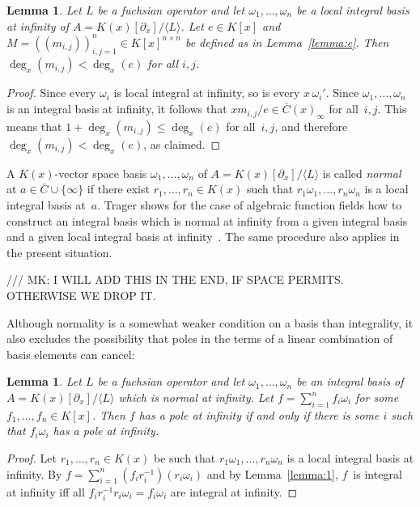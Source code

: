 \documentclass{sig-alternate}
\newtheorem{lemma}[theorem]{Lemma}
\def\<#1>{\langle#1\rangle}
\begin{document}
\begin{lemma} \label{lemma:degM}
  Let $L$ be a fuchsian operator and let $\omega_1,\dots,\omega_n$ be a local integral
  basis at infinity of $A=K(x)[\partial_x]/\<L>$. Let $e\in K[x]$ and $M=((m_{i,j}))_{i,j=1}^n\in K[x]^{n\times n}$
  be defined as in Lemma~\ref{lemma:e}. Then $\deg_x(m_{i,j})<\deg_x(e)$ for all $i,j$.
\end{lemma}
\begin{proof}
  Since every $\omega_i$ is local integral at infinity, so is every $x\,\omega_i'$.
  Since $\omega_1,\dots,\omega_n$ is an integral basis at infinity, it follows that
  $xm_{i,j}/e\in\bar C(x)_\infty$ for all~$i,j$. This means that $1+\deg_x(m_{i,j})\leq\deg_x(e)$
  for all~$i,j$, and therefore $\deg_x(m_{i,j})<\deg_x(e)$, as claimed.
\end{proof}

A $K(x)$-vector space basis $\omega_1,\dots,\omega_n$ of $A=K(x)[\partial_x]/\<L>$ is
called \emph{normal} at $a\in\bar C\cup\{\infty\}$ if there exist $r_1,\dots,r_n\in
K(x)$ such that $r_1\omega_1,\dots,r_n\omega_n$ is a local integral basis
at~$a$. Trager shows for the case of algebraic function fields how to construct
an integral basis which is normal at infinity from a given integral basis and
a given local integral basis at infinity~\cite{trager84}. The same procedure also applies
in the present situation. %

/// MK: I WILL ADD THIS IN THE END, IF SPACE PERMITS. OTHERWISE WE DROP IT.

Although normality is a somewhat weaker condition on a basis than integrality,
it also excludes the possibility that poles in the terms of a linear combination
of basis elements can cancel:

\begin{lemma}\label{lemma:3}
  Let $L$ be a fuchsian operator and let $\omega_1,\dots,\omega_n$ be an integral basis of $A=K(x)[\partial_x]/\<L>$
  which is normal at infinity.
  Let $f=\sum_{i=1}^n f_i\omega_i$ for some $f_1,\dots,f_n\in K[x]$.
  Then $f$ has a pole at infinity if and only if
  there is some $i$ such that $f_i\omega_i$ has a pole at infinity.
\end{lemma}
\begin{proof}
  Let $r_1,\dots,r_n\in K(x)$ be such that $r_1\omega_1,\dots,r_n\omega_n$ is a
  local integral basis at infinity. By $f=\sum_{i=1}^n
  (f_ir_i^{-1})(r_i\omega_i)$ and by Lemma~\ref{lemma:1}, $f$~is integral at infinity iff all
  $f_ir_i^{-1}r_i\omega_i=f_i\omega_i$ are integral at infinity.
\end{proof}
\end{document}
